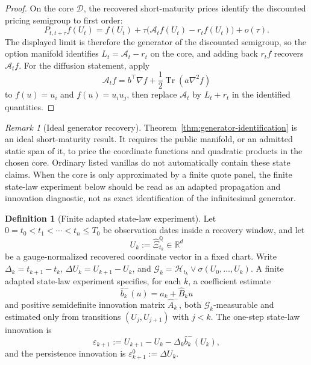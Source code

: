 \documentclass[11pt,a4paper]{amsart}
\theoremstyle{plain}
\theoremstyle{definition}
\newtheorem{definition}[theorem]{Definition}
\theoremstyle{remark}
\newtheorem{remark}[theorem]{Remark}
\newcommand{\R}{\mathbb{R}}
\newcommand{\QQ}{\mathbb{Q}}
\newcommand{\cD}{\mathcal{D}}
\newcommand{\cG}{\mathcal{G}}
\newcommand{\cH}{\mathcal{H}}
\begin{document}
\begin{proof}
On the core \(\cD\), the recovered short-maturity prices identify the discounted pricing
semigroup to first order:
\[
        P_{t,t+\tau}f(U_t)
        =
        f(U_t)+\tau\bigl(\mathcal A_tf(U_t)-r_tf(U_t)\bigr)+o(\tau).
\]
The displayed limit is therefore the generator of the discounted semigroup, so the option manifold
identifies \(L_t=\mathcal A_t-r_t\) on the core, and adding back \(r_tf\) recovers
\(\mathcal A_tf\).  For the diffusion statement, apply
\[
        \mathcal A_tf=b^\top\nabla f+\frac12\operatorname{Tr}(a\nabla^2f)
\]
to \(f(u)=u_i\) and \(f(u)=u_iu_j\), then replace \(\mathcal A_t\) by \(L_t+r_t\) in the
identified quantities.
\end{proof}

\begin{remark}[Ideal generator recovery]\label{rem:ideal-generator-recovery}
Theorem~\ref{thm:generator-identification} is an ideal short-maturity result.  It requires the
public manifold, or an admitted static span of it, to price the coordinate functions and
quadratic products in the chosen core.  Ordinary listed vanillas do not automatically contain
these state claims.  When the core is only approximated by a finite quote panel, the finite
state-law experiment below should be read as an adapted propagation and innovation diagnostic,
not as exact identification of the infinitesimal generator.
\end{remark}

\begin{definition}[Finite adapted state-law experiment]\label{def:finite-state-law-experiment}
Let \(0=t_0<t_1<\cdots<t_n\le T_0\) be observation dates inside a recovery window, and let
\[
        U_k:=\widehat\Xi_{t_k}^{\QQ}\in\R^d
\]
be a gauge-normalized recovered coordinate vector in a fixed chart.  Write
\(\Delta_k=t_{k+1}-t_k\), \(\Delta U_k=U_{k+1}-U_k\), and
\(\cG_k=\cH_{t_k}\vee\sigma(U_0,\dots,U_k)\).  A finite adapted state-law experiment specifies,
for each \(k\), a coefficient estimate
\[
        \widehat b_{k}^{-}(u)=\widehat a_k+\widehat B_ku
\]
and positive semidefinite innovation matrix \(\widehat A_k^{-}\), both
\(\cG_k\)-measurable and estimated only from transitions
\((U_j,U_{j+1})\) with \(j<k\).  The one-step state-law innovation is
\[
        \varepsilon_{k+1}
        :=
        U_{k+1}-U_k-\Delta_k\widehat b_k^-(U_k),
\]
and the persistence innovation is \(\varepsilon_{k+1}^{0}:=\Delta U_k\).
\end{definition}
\end{document}
